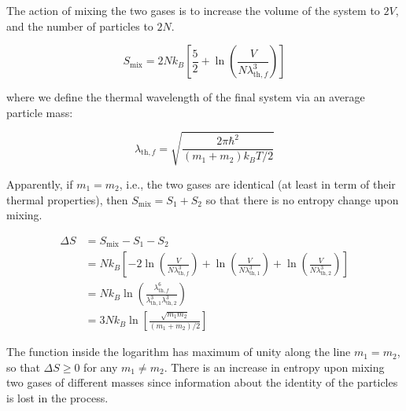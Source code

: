 \documentclass[12pt]{article}
\begin{document}
The action of mixing the two gases is to increase the volume of the system to $2V$, and the number of particles to $2N$. 

\begin{equation}
    S_{\text{mix}} = 2Nk_{B} \left[ \frac{5}{2} + \ln{\left( \frac{V}{N\lambda_{\text{th}, f}^{3}} \right)} \right]
\end{equation}

where we define the thermal wavelength of the final system via an average particle mass:

\begin{equation}
    \lambda_{\text{th}, f} = \sqrt{\frac{2\pi\hbar^{2}}{(m_{1} + m_{2}) k_{B}T/2}}
\end{equation}

Apparently, if $m_{1} = m_{2}$, i.e., the two gases are identical (at least in term of their thermal properties), then $S_{\text{mix}} = S_{1} + S_{2}$ so that there is no entropy change upon mixing. 

\begin{equation}
    \begin{split}
        \Delta S &= S_{\text{mix}} - S_{1} - S_{2} \\
        &= Nk_{B} \left[ -2\ln{\left( \frac{V}{N\lambda_{\text{th}, f}^{3}} \right)} + \ln{\left( \frac{V}{N\lambda_{\text{th}, 1}^{3}} \right)} + \ln{\left( \frac{V}{N\lambda_{\text{th}, 2}^{3}} \right)} \right] \\
        &= Nk_{B} \ln{\left( \frac{\lambda_{\text{th}, f}^{6}}{\lambda_{\text{th}, 1}^{3}\lambda_{\text{th}, 2}^{3}} \right)} \\
        &= 3Nk_{B} \ln{\left[ \frac{\sqrt{m_{1}m_{2}}}{(m_{1} + m_{2})/2} \right]}
    \end{split}
\end{equation}

The function inside the logarithm has maximum of unity along the line $m_{1} = m_{2}$, so that $\Delta S \geq 0$ for any $m_{1} \neq m_{2}$. There is an increase in entropy upon mixing two gases of different masses since information about the identity of the particles is lost in the process.
\end{document}
